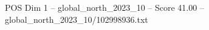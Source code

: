 \begin{textsample}{POS Dim 1 – global\_north\_2023\_10 – Score 41.00 – global\_north\_2023\_10/102998936.txt}
\end{textsample}
